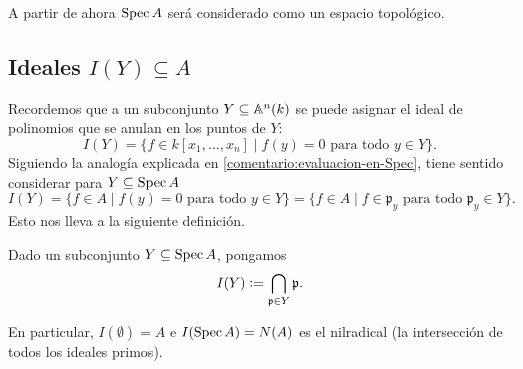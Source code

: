 \documentclass{article}
\numberwithin{equation}{section}
\theoremstyle{definition}
\begin{document}
A partir de ahora $\Spec A$ será considerado como un espacio topológico.

\subsection{Ideales $I (Y) \subseteq A$}

Recordemos que a un subconjunto $Y \subseteq \AA^n (k)$ se puede asignar
el ideal de polinomios que se anulan en los puntos de $Y$:
$$I (Y) = \{ f \in k [x_1,\ldots,x_n] \mid f (y) = 0 \text{ para todo }y\in Y \}.$$
Siguiendo la analogía explicada en \ref{comentario:evaluacion-en-Spec}, tiene
sentido considerar para $Y \subseteq \Spec A$
\[ I (Y) = \{ f \in A \mid f (y) = 0\text{ para todo }y\in Y \} =
   \{ f \in A \mid f\in\mathfrak{p}_y\text{ para todo }\mathfrak{p}_y\in Y \}. \]
Esto nos lleva a la siguiente definición.

\begin{definicion}
  \label{dfn:ideal-I}
  Dado un subconjunto $Y \subseteq \Spec A$, pongamos
  $$I (Y) \dfn \bigcap_{\mathfrak{p} \in Y} \mathfrak{p}.$$
\end{definicion}

En particular, $I (\emptyset) = A$ e $I (\Spec A) = N (A)$ es el nilradical
(la intersección de todos los ideales primos).
\end{document}
